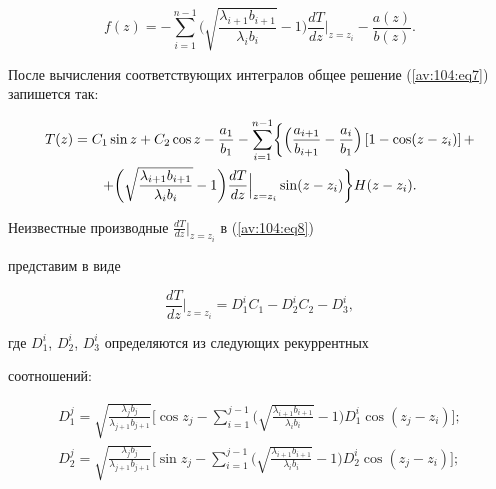 $$

f(z)=-\sum\limits_{i=1}^{n-1} \biggl( \sqrt {\frac{\lambda _{i+1} b_{i+1}

}{\lambda _i b_i }} -1\biggr)\frac{dT}{dz} \Big|_{z=z_i }

-\frac{a(z)}{b(z)}.

$$





После вычисления соответствующих интегралов общее решение (\ref{av:104:eq7}) запишется так:

\begin{multline}

\label{av:104:eq8}

 T(z)=C_1 \sin z+C_2 \cos z-\frac{a_1 }{b_1 }-

\sum\limits_{i=1}^{n-1}

\biggl\{ \Bigl( \frac{a_{i+1} }{b_{i+1} }-\frac{a_i }{b_1 } \Bigr)

 \left[ 1-\cos (z-z_i ) \right]+

\\

+\biggl( \sqrt {\frac{\lambda _{i+1} b_{i+1} }{\lambda _i b_i }} -1

\biggr)\frac{dT}{dz} \Big|_{z=z_i } \sin (z-z_i ) \biggr\} H(z-z_i ).

\end{multline}



Неизвестные производные $\frac{dT}{dz} \big|_{z=z_i } $ в (\ref{av:104:eq8})

представим в виде

\begin{equation}

\label{av:104:eq9}

\frac{dT}{dz} \Big|_{z=z_i } =D_1^i C_1 -D_2^i C_2 -D_3^i ,

\end{equation}

где $D_1^i $, $D_2^i $, $D_3^i $ определяются из следующих рекуррентных

соотношений:

\begin{gather}

\label{av:104:eq10}

D_1^j =\sqrt {\frac{\lambda _j b_j }{\lambda _{j+1} b_{j+1} }}

\biggl[ \cos z_j -\sum\limits_{i=1}^{j-1} \biggl( \sqrt {\frac{\lambda _{i+1} b_{i+1}

}{\lambda _i b_i }} -1\biggr)  D_1^i \cos (z_j -z_i ) \biggr];

\\

\label{av:104:eq11}

D_2^j =\sqrt {\frac{\lambda _j b_j }{\lambda _{j+1} b_{j+1} }}

\biggl[ \sin

z_j -\sum\limits_{i=1}^{j-1} \biggl( \sqrt {\frac{\lambda _{i+1} b_{i+1}

}{\lambda _i b_i }} -1 \biggr) D_2^i \cos (z_j -z_i ) \biggr];

\end{gather}

